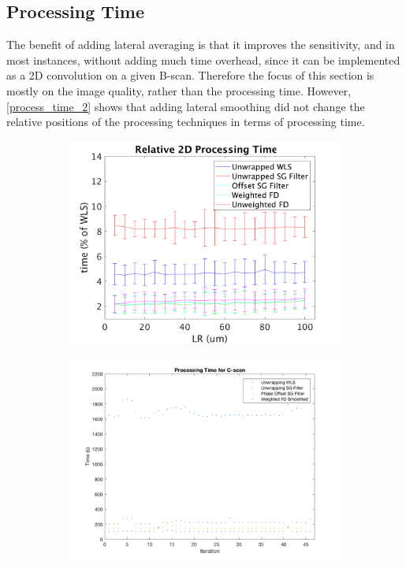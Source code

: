 \subsection{Processing Time}
The benefit of adding lateral averaging is that it improves the sensitivity, and in most instances, without adding much time overhead, since it can be implemented as a 2D convolution on a given B-scan. Therefore the focus of this section is mostly on the image quality, rather than the processing time. However, \autoref{process_time_2} shows that adding lateral smoothing did not change the relative positions of the processing techniques in terms of processing time.

\begin{figure}[th!]
	\centering
    \begin{subfigure}{0.49\textwidth}
    	\centering
        \includegraphics[width=\textwidth]{figures/2d_relative_lr.png}
    \end{subfigure}
    \begin{subfigure}{0.49\textwidth}
    	\centering
        \includegraphics[width=\textwidth]{figures/3d_time_1.png}

\end{subfigure}
\end{figure}
